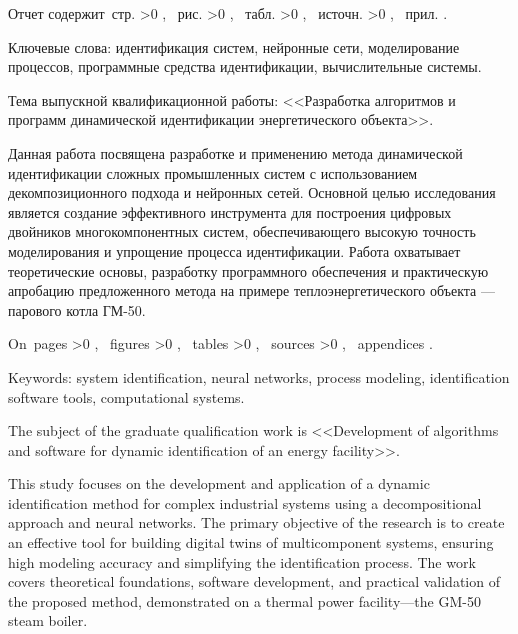 \begin{Referat}

    Отчет содержит \pageref{LastPage}\,стр.%
    \ifnum \totfig >0 , \totfig~рис.%
    \fi
    \ifnum \tottab >0 , \tottab~табл.%
    \fi
    \ifnum \totbib >0 , \totbib~источн.%
    \fi
    \ifnum \totapp >0 , \totapp~прил.%
    \else
    .%
    \fi

    Ключевые слова: идентификация систем, нейронные сети, моделирование
    процессов, программные средства идентификации, вычислительные системы.

    Тема выпускной квалификационной работы: <<Разработка алгоритмов и программ
    динамической идентификации энергетического объекта>>.

    Данная работа посвящена разработке и применению метода динамической
    идентификации сложных промышленных систем с использованием декомпозиционного
    подхода и нейронных сетей. Основной целью исследования является создание
    эффективного инструмента для построения цифровых двойников многокомпонентных
    систем, обеспечивающего высокую точность моделирования и упрощение процесса
    идентификации. Работа охватывает теоретические основы, разработку
    программного обеспечения и практическую апробацию предложенного метода на
    примере теплоэнергетического объекта — парового котла ГМ-50. 
    \nocite{*}

\end{Referat}



\begin{ReferatEng}

    On \pageref{LastPage}\,pages%
    \ifnum \totfig >0 , \totfig~figures%
    \fi
    \ifnum \tottab >0 , \tottab~tables%
    \fi
    \ifnum \totbib >0 , \totbib~sources%
    \fi
    \ifnum \totapp >0 , \totapp~appendices%
    \else
    .%
    \fi

    Keywords: system identification, neural networks, process modeling,
    identification software tools, computational systems.

    The subject of the graduate qualification work is <<Development of
    algorithms and software for dynamic identification of an energy facility>>.

    This study focuses on the development and application of a dynamic
    identification method for complex industrial systems using a decompositional
    approach and neural networks. The primary objective of the research is to
    create an effective tool for building digital twins of multicomponent
    systems, ensuring high modeling accuracy and simplifying the identification
    process. The work covers theoretical foundations, software development, and
    practical validation of the proposed method, demonstrated on a thermal power
    facility—the GM-50 steam boiler.
    \nocite{*}

\end{ReferatEng}